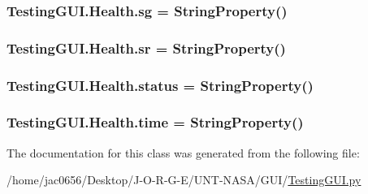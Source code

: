 \subsubsection[{\texorpdfstring{sg}{sg}}]{\setlength{\rightskip}{0pt plus 5cm}Testing\+G\+U\+I.\+Health.\+sg = String\+Property()\hspace{0.3cm}{\ttfamily [static]}}\hypertarget{classTestingGUI_1_1Health_a75c173389aca62526762c23fd2b727fa}{}\label{classTestingGUI_1_1Health_a75c173389aca62526762c23fd2b727fa}
\subsubsection[{\texorpdfstring{sr}{sr}}]{\setlength{\rightskip}{0pt plus 5cm}Testing\+G\+U\+I.\+Health.\+sr = String\+Property()\hspace{0.3cm}{\ttfamily [static]}}\hypertarget{classTestingGUI_1_1Health_af6181cd5d8046197aed006d3e3551ae0}{}\label{classTestingGUI_1_1Health_af6181cd5d8046197aed006d3e3551ae0}
\subsubsection[{\texorpdfstring{status}{status}}]{\setlength{\rightskip}{0pt plus 5cm}Testing\+G\+U\+I.\+Health.\+status = String\+Property()\hspace{0.3cm}{\ttfamily [static]}}\hypertarget{classTestingGUI_1_1Health_ab0a961f891da2e855ac40338fa5cd40d}{}\label{classTestingGUI_1_1Health_ab0a961f891da2e855ac40338fa5cd40d}
\subsubsection[{\texorpdfstring{time}{time}}]{\setlength{\rightskip}{0pt plus 5cm}Testing\+G\+U\+I.\+Health.\+time = String\+Property()\hspace{0.3cm}{\ttfamily [static]}}\hypertarget{classTestingGUI_1_1Health_a54e3f1adc11ad4d864b67012799706ac}{}\label{classTestingGUI_1_1Health_a54e3f1adc11ad4d864b67012799706ac}


The documentation for this class was generated from the following file\+:\begin{DoxyCompactItemize}
\item 
/home/jac0656/\+Desktop/\+J-\/\+O-\/\+R-\/\+G-\/\+E/\+U\+N\+T-\/\+N\+A\+S\+A/\+G\+U\+I/\hyperlink{GUI_2TestingGUI_8py}{Testing\+G\+U\+I.\+py}\end{DoxyCompactItemize}
